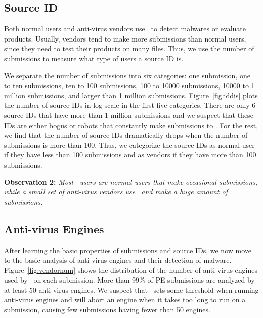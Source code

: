 \subsection{Source ID}
\label{sec:source_id}



Both normal users and anti-virus vendors use \vt\ to detect malwares or evaluate products.
Usually, vendors tend to make more submissions than normal users, since they need to test their products on many files.
Thus, we use the number of submissions to measure what type of users a source ID is.

We separate the number of submissions into six categories:
one submission, one to ten submissions, ten to 100 submissions, 100 to 10000 submissions, 10000 to 1 million submissions, and larger than 1 million submissions.
Figure~\ref{fig:iddis} plots the number of source IDs in log scale in the first five categories.
There are only 6 source IDs that have more than 1 million submissions and we suspect that these IDs are either bogus or robots 
that constantly make submissions to \vt.
For the rest, we find that the number of source IDs dramatically drops when the number of submissions is more than 100.
Thus, we categorize the source IDs as normal user if they have less than 100 submissions and as vendors if they have more than 100 submissions.

{\bf Observation 2:} 
{\em Most \vt\ users are normal users that make occasional submissions, while a small set of anti-virus vendors use \vt\ and make a huge amount of submissions.}



\subsection{Anti-virus Engines}





After learning the basic properties of submissions and source IDs, 
we now move to the basic analysis of anti-virus engines and their detection of malware.
Figure~\ref{fig:vendornum} shows the distribution of the number of anti-virus engines used by \vt\ on each submission. 
More than 99\% of PE submissions are analyzed by at least 50 anti-virus engines. 
We suspect that \vt\ sets some threshold when running anti-virus engines and 
will abort an engine when it takes too long to run on a submission,
causing few submissions having fewer than 50 engines.

